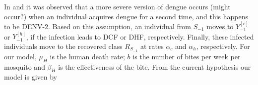         In \cite{OhAinle2011} and
        \cite{Sangkawibha1984} it was observed that a more severe version
        of dengue occurs (might occur?) when an individual acquires dengue
        for a second time, and this happens to be DENV-2. Based on this
        assumption, an individual from $S_{-1}$ moves to $Y_{-1}^{[c]}$ or
        $Y_{-1}^{[h]}$, if the infection leads to DCF or DHF, respectively.
        Finally, these infected individuals move to the recovered class
        $R_{S_{-1}}$ at rates $\alpha_c$ and $\alpha_h$, respectively. For
        our model, $\mu_H$ is the human death rate; $b$ is the number of
        bites per week per mosquito and $\beta_H$ is the effectiveness of
        the bite. From the current hypothesis our model is given by    


